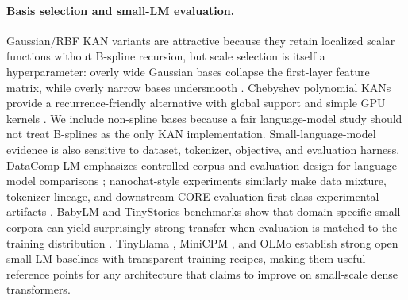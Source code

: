 \documentclass{article}
\begin{document}
\paragraph{Basis selection and small-LM evaluation.}
Gaussian/RBF KAN variants are attractive because they retain localized scalar functions without B-spline recursion, but scale selection is itself a hyperparameter: overly wide Gaussian bases collapse the first-layer feature matrix, while overly narrow bases undersmooth \citep{noorizadegan2026gaussian}. Chebyshev polynomial KANs provide a recurrence-friendly alternative with global support and simple GPU kernels \citep{sidharth2024chebyshev}. We include non-spline bases because a fair language-model study should not treat B-splines as the only KAN implementation. Small-language-model evidence is also sensitive to dataset, tokenizer, objective, and evaluation harness. DataComp-LM emphasizes controlled corpus and evaluation design for language-model comparisons \citep{li2024datacomp}; nanochat-style experiments similarly make data mixture, tokenizer lineage, and downstream CORE evaluation first-class experimental artifacts \citep{karpathy2025nanochat}. BabyLM and TinyStories benchmarks show that domain-specific small corpora can yield surprisingly strong transfer when evaluation is matched to the training distribution \citep{eldan2023tinystories,warstadt2023babylm}. TinyLlama \citep{zhang2024tinyllama}, MiniCPM \citep{hu2024minicpm}, and OLMo \citep{groeneveld2024olmo} establish strong open small-LM baselines with transparent training recipes, making them useful reference points for any architecture that claims to improve on small-scale dense transformers.
\end{document}
